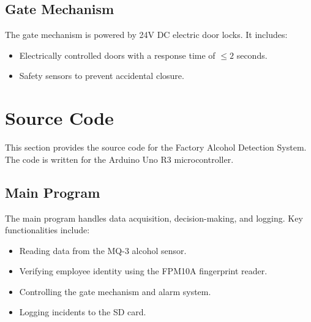 \subsection{Gate Mechanism}
The gate mechanism is powered by 24V DC electric door locks. It includes:
\begin{itemize}
    \item Electrically controlled doors with a response time of $\leq 2$ seconds.
    \item Safety sensors to prevent accidental closure.
\end{itemize}

\section{Source Code}
\label{app:source_code}

This section provides the source code for the Factory Alcohol Detection System. The code is written for the Arduino Uno R3 microcontroller.

\subsection{Main Program}
The main program handles data acquisition, decision-making, and logging. Key functionalities include:
\begin{itemize}
    \item Reading data from the MQ-3 alcohol sensor.
    \item Verifying employee identity using the FPM10A fingerprint reader.
    \item Controlling the gate mechanism and alarm system.
    \item Logging incidents to the SD card.
\end{itemize}


